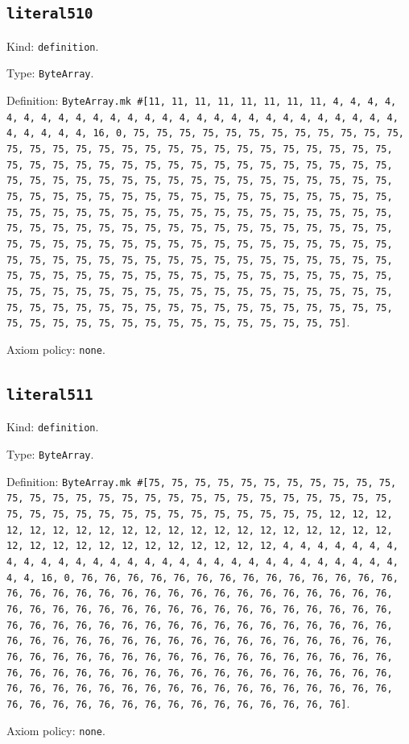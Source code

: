 \documentclass[11pt]{article}
\begin{document}
\subsection*{\texttt{literal510}}
\noindent Kind: \texttt{definition}.\par
\noindent Type: \texttt{ByteArray}.\par
\noindent Definition: \texttt{ByteArray.mk \#[11, 11, 11, 11, 11, 11, 11, 11, 4, 4, 4, 4, 4, 4, 4, 4, 4, 4, 4, 4, 4, 4, 4, 4, 4, 4, 4, 4, 4, 4, 4, 4, 4, 4, 4, 4, 4, 4, 4, 4, 16, 0, 75, 75, 75, 75, 75, 75, 75, 75, 75, 75, 75, 75, 75, 75, 75, 75, 75, 75, 75, 75, 75, 75, 75, 75, 75, 75, 75, 75, 75, 75, 75, 75, 75, 75, 75, 75, 75, 75, 75, 75, 75, 75, 75, 75, 75, 75, 75, 75, 75, 75, 75, 75, 75, 75, 75, 75, 75, 75, 75, 75, 75, 75, 75, 75, 75, 75, 75, 75, 75, 75, 75, 75, 75, 75, 75, 75, 75, 75, 75, 75, 75, 75, 75, 75, 75, 75, 75, 75, 75, 75, 75, 75, 75, 75, 75, 75, 75, 75, 75, 75, 75, 75, 75, 75, 75, 75, 75, 75, 75, 75, 75, 75, 75, 75, 75, 75, 75, 75, 75, 75, 75, 75, 75, 75, 75, 75, 75, 75, 75, 75, 75, 75, 75, 75, 75, 75, 75, 75, 75, 75, 75, 75, 75, 75, 75, 75, 75, 75, 75, 75, 75, 75, 75, 75, 75, 75, 75, 75, 75, 75, 75, 75, 75, 75, 75, 75, 75, 75, 75, 75, 75, 75, 75, 75, 75, 75, 75, 75, 75, 75, 75, 75, 75, 75, 75, 75, 75, 75, 75, 75, 75, 75, 75, 75, 75, 75, 75, 75, 75, 75, 75, 75, 75, 75, 75, 75, 75, 75, 75, 75, 75, 75, 75, 75]}.\par
\noindent Axiom policy: \texttt{none}.\par
\subsection*{\texttt{literal511}}
\noindent Kind: \texttt{definition}.\par
\noindent Type: \texttt{ByteArray}.\par
\noindent Definition: \texttt{ByteArray.mk \#[75, 75, 75, 75, 75, 75, 75, 75, 75, 75, 75, 75, 75, 75, 75, 75, 75, 75, 75, 75, 75, 75, 75, 75, 75, 75, 75, 75, 75, 75, 75, 75, 75, 75, 75, 75, 75, 75, 75, 75, 75, 75, 12, 12, 12, 12, 12, 12, 12, 12, 12, 12, 12, 12, 12, 12, 12, 12, 12, 12, 12, 12, 12, 12, 12, 12, 12, 12, 12, 12, 12, 12, 12, 12, 4, 4, 4, 4, 4, 4, 4, 4, 4, 4, 4, 4, 4, 4, 4, 4, 4, 4, 4, 4, 4, 4, 4, 4, 4, 4, 4, 4, 4, 4, 4, 4, 16, 0, 76, 76, 76, 76, 76, 76, 76, 76, 76, 76, 76, 76, 76, 76, 76, 76, 76, 76, 76, 76, 76, 76, 76, 76, 76, 76, 76, 76, 76, 76, 76, 76, 76, 76, 76, 76, 76, 76, 76, 76, 76, 76, 76, 76, 76, 76, 76, 76, 76, 76, 76, 76, 76, 76, 76, 76, 76, 76, 76, 76, 76, 76, 76, 76, 76, 76, 76, 76, 76, 76, 76, 76, 76, 76, 76, 76, 76, 76, 76, 76, 76, 76, 76, 76, 76, 76, 76, 76, 76, 76, 76, 76, 76, 76, 76, 76, 76, 76, 76, 76, 76, 76, 76, 76, 76, 76, 76, 76, 76, 76, 76, 76, 76, 76, 76, 76, 76, 76, 76, 76, 76, 76, 76, 76, 76, 76, 76, 76, 76, 76, 76, 76, 76, 76, 76, 76, 76, 76, 76, 76, 76, 76, 76, 76, 76, 76, 76, 76]}.\par
\noindent Axiom policy: \texttt{none}.\par
\end{document}
